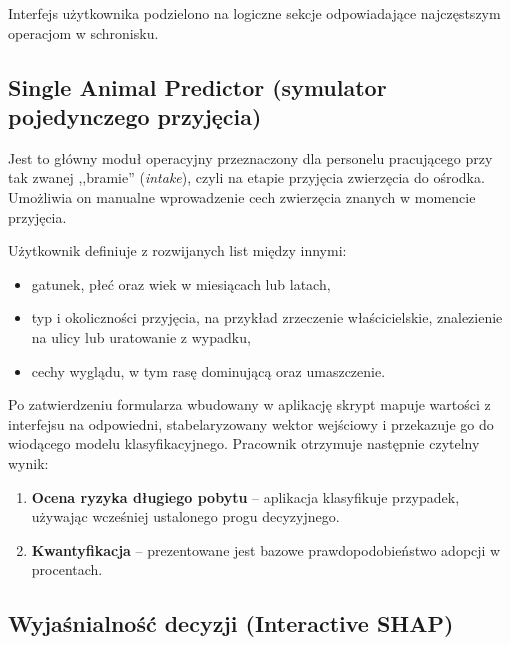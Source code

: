 Interfejs użytkownika podzielono na logiczne sekcje odpowiadające najczęstszym operacjom w schronisku.

\subsection{Single Animal Predictor (symulator pojedynczego przyjęcia)}
\label{subsec:single-animal-predictor}

Jest to główny moduł operacyjny przeznaczony dla personelu pracującego przy tak zwanej ,,bramie'' (\emph{intake}), czyli na etapie przyjęcia zwierzęcia do ośrodka. Umożliwia on manualne wprowadzenie cech zwierzęcia znanych w momencie przyjęcia.

Użytkownik definiuje z rozwijanych list między innymi:

\begin{itemize}
    \item gatunek, płeć oraz wiek w miesiącach lub latach,
    \item typ i okoliczności przyjęcia, na przykład zrzeczenie właścicielskie, znalezienie na ulicy lub uratowanie z wypadku,
    \item cechy wyglądu, w tym rasę dominującą oraz umaszczenie.
\end{itemize}

Po zatwierdzeniu formularza wbudowany w aplikację skrypt mapuje wartości z interfejsu na odpowiedni, stabelaryzowany wektor wejściowy i przekazuje go do wiodącego modelu klasyfikacyjnego. Pracownik otrzymuje następnie czytelny wynik:

\begin{enumerate}
    \item \textbf{Ocena ryzyka długiego pobytu} -- aplikacja klasyfikuje przypadek, używając wcześniej ustalonego progu decyzyjnego.
    \item \textbf{Kwantyfikacja} -- prezentowane jest bazowe prawdopodobieństwo adopcji w procentach.
\end{enumerate}


\subsection{Wyjaśnialność decyzji (Interactive SHAP)}
\label{subsec:wyjasnialnosc-decyzji-interactive-shap}

